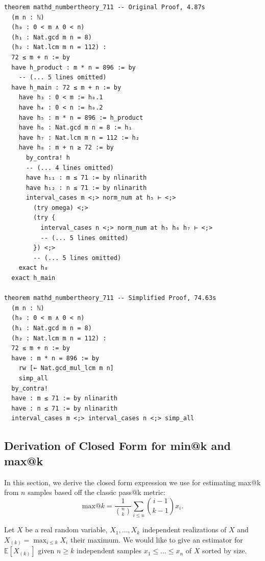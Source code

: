 \begin{tcolorbox}[colback=lightblue, boxrule=0pt, arc=5pt, outer arc=5pt, after skip=10pt plus 2pt]
\begin{lstlisting}[caption={Example of Slowdown after Simplification (orig: 4.9s, new: 74.6s)},label={lst:minif2f-slowdown-2}, captionpos=t, language=lean, breaklines=true, style=mystyle]
theorem mathd_numbertheory_711 -- Original Proof, 4.87s
  (m n : ℕ)
  (h₀ : 0 < m ∧ 0 < n)
  (h₁ : Nat.gcd m n = 8)
  (h₂ : Nat.lcm m n = 112) :
  72 ≤ m + n := by
  have h_product : m * n = 896 := by
    -- (... 5 lines omitted)
  have h_main : 72 ≤ m + n := by
    have h₃ : 0 < m := h₀.1
    have h₄ : 0 < n := h₀.2
    have h₅ : m * n = 896 := h_product
    have h₆ : Nat.gcd m n = 8 := h₁
    have h₇ : Nat.lcm m n = 112 := h₂
    have h₈ : m + n ≥ 72 := by
      by_contra! h
      -- (... 4 lines omitted)
      have h₁₁ : m ≤ 71 := by nlinarith
      have h₁₂ : n ≤ 71 := by nlinarith
      interval_cases m <;> norm_num at h₅ ⊢ <;>
        (try omega) <;>
        (try {
          interval_cases n <;> norm_num at h₅ h₆ h₇ ⊢ <;>
          -- (... 5 lines omitted)
        }) <;>
        -- (... 5 lines omitted)
    exact h₈
  exact h_main

theorem mathd_numbertheory_711 -- Simplified Proof, 74.63s
  (m n : ℕ)
  (h₀ : 0 < m ∧ 0 < n)
  (h₁ : Nat.gcd m n = 8)
  (h₂ : Nat.lcm m n = 112) :
  72 ≤ m + n := by
  have : m * n = 896 := by
    rw [← Nat.gcd_mul_lcm m n]
    simp_all
  by_contra!
  have : m ≤ 71 := by nlinarith
  have : n ≤ 71 := by nlinarith
  interval_cases m <;> interval_cases n <;> simp_all
\end{lstlisting}
\end{tcolorbox}

\newpage
\subsection{Derivation of Closed Form for min@k and max@k}
\label{app:estimation}
In this section, we derive the closed form expression we use for estimating max@k from $n$ samples based off the classic pass@k metric:
\[\text{max@}k = \frac{1}{\binom{n}{k}}\sum_{i \leq n} \binom{i-1}{k-1} x_i. \]

Let $X$ be a real random variable, $X_1, \ldots, X_k$ independent realizations of $X$ and $X_{(k)} = \max_{i \leq k} X_i$ their maximum. We would like to give an estimator for $\mathbb{E}[X_{(k)}]$ given $n \geq k$ independent samples $x_1 \leq \ldots \leq x_n$ of $X$ sorted by size.

